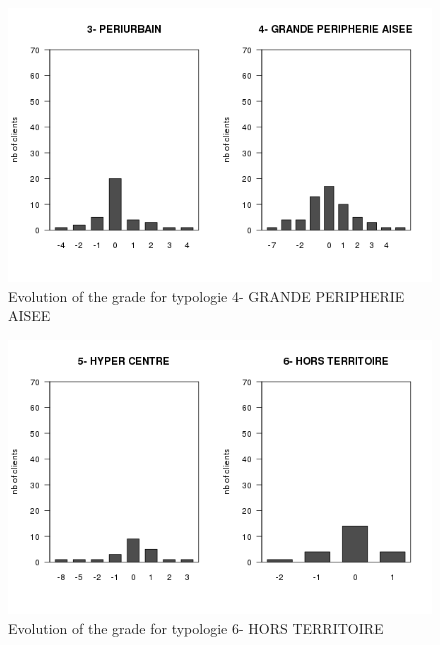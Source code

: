 \documentclass[a4paper, 11pt]{article}
\begin{document}
        \begin{figure}[!ht]
                \centering
                \includegraphics[height = 10 cm]{Remi/Evolution_of_the_grade_for_typologie_4-GRANDE-PERIPHERIE-AISEE.png}
                \caption{Evolution of the grade for typologie 4- GRANDE PERIPHERIE AISEE}
                \label{fig:e_typo4}
        \end{figure}

        \begin{figure}[!ht]
                \centering
                \includegraphics[height = 10 cm]{Remi/Evolution_of_the_grade_for_typologie_6-HORS-TERRITOIRE.png}
                \caption{Evolution of the grade for typologie 6- HORS TERRITOIRE}
                \label{fig:e_typo6}
        \end{figure}
        
\end{document}
